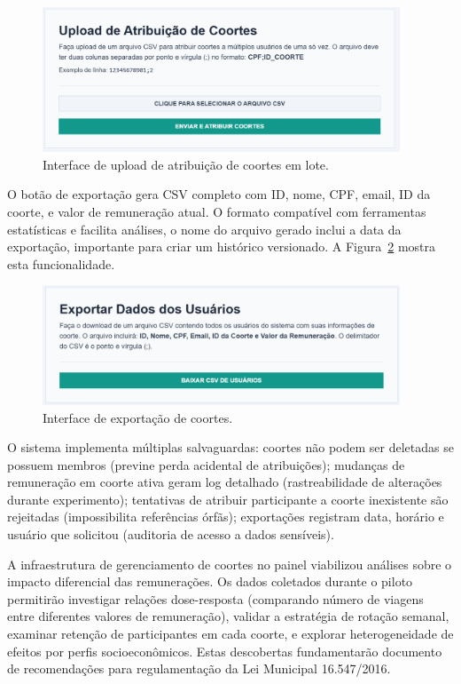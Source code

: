 \begin{figure}[htb]
    \centering
    \includegraphics[width=0.95\textwidth]{figuras/upload_coortes.PNG}
    \caption{Interface de upload de atribuição de coortes em lote.}
    \label{fig:coortes_listagem_upload}
  \end{figure}

O botão de exportação gera CSV completo com ID, nome, CPF, email, ID da coorte, e valor de remuneração atual. O formato compatível com ferramentas estatísticas e facilita análises, o nome do arquivo gerado inclui a data da exportação, importante para criar um histórico versionado. A Figura~\ref{fig:coortes_listagem_exportar} mostra esta funcionalidade.

\begin{figure}[htb]
    \centering
    \includegraphics[width=0.95\textwidth]{figuras/exportar_coortes.PNG}
    \caption{Interface de exportação de coortes.}
    \label{fig:coortes_listagem_exportar}
  \end{figure}

O sistema implementa múltiplas salvaguardas: coortes não podem ser deletadas se possuem membros (previne perda acidental de atribuições); mudanças de remuneração em coorte ativa geram log detalhado (rastreabilidade de alterações durante experimento); tentativas de atribuir participante a coorte inexistente são rejeitadas (impossibilita referências órfãs); exportações registram data, horário e usuário que solicitou (auditoria de acesso a dados sensíveis).

A infraestrutura de gerenciamento de coortes no painel viabilizou análises sobre o impacto diferencial das remunerações. Os dados coletados durante o piloto permitirão investigar relações dose-resposta (comparando número de viagens entre diferentes valores de remuneração), validar a estratégia de rotação semanal, examinar retenção de participantes em cada coorte, e explorar heterogeneidade de efeitos por perfis socioeconômicos. Estas descobertas fundamentarão documento de recomendações para regulamentação da Lei Municipal 16.547/2016.


